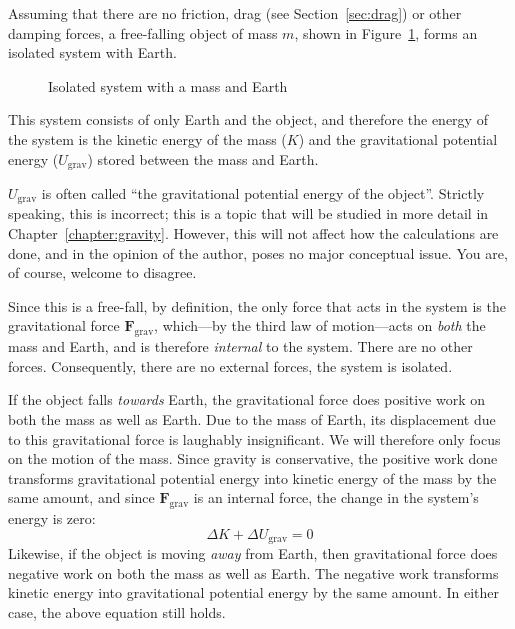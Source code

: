 Assuming that there are no friction, drag (see Section~\ref{sec:drag}) or other
damping forces, a free-falling object of mass $m$, shown in
Figure~\ref{fig:earth}, forms an isolated system with Earth.
\begin{figure}[ht]
  \centering
  \caption{Isolated system with a mass and Earth}
  \label{fig:earth}
\end{figure}
This system consists of only Earth and the object, and therefore the energy of
the system is the kinetic energy of the mass ($K$) and the gravitational
potential energy ($U_\text{grav}$) stored between the mass and Earth.
\begin{remark}
  $U_\text{grav}$ is often called ``the gravitational potential energy of the
  object''. Strictly speaking, this is incorrect; this is a topic that will be
  studied in more detail in Chapter~\ref{chapter:gravity}. However, this will
  not affect how the calculations are done, and in the opinion of the author,
  poses no major conceptual issue. You are, of course, welcome to disagree.
\end{remark}
Since this is a free-fall, by definition, the only force that acts in the
system is the gravitational force $\bm F_\text{grav}$, which---by the third law
of motion---acts on \emph{both} the mass and Earth, and is therefore
\emph{internal} to the system. There are no other forces. Consequently, there
are no external forces, the system is isolated.

If the object falls \emph{towards} Earth, the gravitational force does positive
work on both the mass as well as Earth. Due to the mass of Earth, its
displacement due to this gravitational force is laughably insignificant. We
will therefore only focus on the motion of the mass. Since gravity is
conservative, the positive work done transforms gravitational potential energy
into kinetic energy of the mass by the same amount, and since
$\bm F_\text{grav}$ is an internal force, the change in the system's energy is
zero:
\begin{equation}
  \Delta K + \Delta U_\text{grav}=0
\end{equation}
Likewise, if the object is moving \emph{away} from Earth, then gravitational
force does negative work on both the mass as well as Earth. The negative work
transforms kinetic energy into gravitational potential energy by the same
amount. In either case, the above equation still holds.

